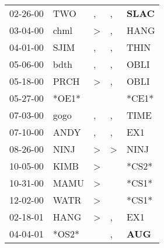 \begin{supertabular}{p{0.07\textwidth}p{0.06\textwidth}p{0.02\textwidth}p{0.02\textwidth}p{0.06\textwidth}}
          02-26-00\textsuperscript{} &            TWO\textsuperscript{} &                , &                , &  \textbf{SLAC\textsuperscript{}} \\
          03-04-00\textsuperscript{} &           chml\textsuperscript{} &     \textgreater &                , &           HANG\textsuperscript{} \\
          04-01-00\textsuperscript{} &           SJIM\textsuperscript{} &                , &                , &           THIN\textsuperscript{} \\
          05-06-00\textsuperscript{} &           bdth\textsuperscript{} &                , &                , &           OBLI\textsuperscript{} \\
          05-18-00\textsuperscript{} &           PRCH\textsuperscript{} &     \textgreater &                , &           OBLI\textsuperscript{} \\
          05-27-00\textsuperscript{} &                            *OE1* &                  &                  &                            *CE1* \\
          07-03-00\textsuperscript{} &           gogo\textsuperscript{} &                , &                , &           TIME\textsuperscript{} \\
          07-10-00\textsuperscript{} &           ANDY\textsuperscript{} &                , &                , &            EX1\textsuperscript{} \\
          08-26-00\textsuperscript{} &           NINJ\textsuperscript{} &     \textgreater &     \textgreater &           NINJ\textsuperscript{} \\
          10-05-00\textsuperscript{} &           KIMB\textsuperscript{} &     \textgreater &                  &                            *CS2* \\
          10-31-00\textsuperscript{} &           MAMU\textsuperscript{} &     \textgreater &                  &                            *CS1* \\
          12-02-00\textsuperscript{} &           WATR\textsuperscript{} &     \textgreater &                  &                            *CS1* \\
          02-18-01\textsuperscript{} &           HANG\textsuperscript{} &     \textgreater &                , &            EX1\textsuperscript{} \\
          04-04-01\textsuperscript{} &                            *OS2* &                  &                , &   \textbf{AUG\textsuperscript{}} \\

\end{supertabular}
